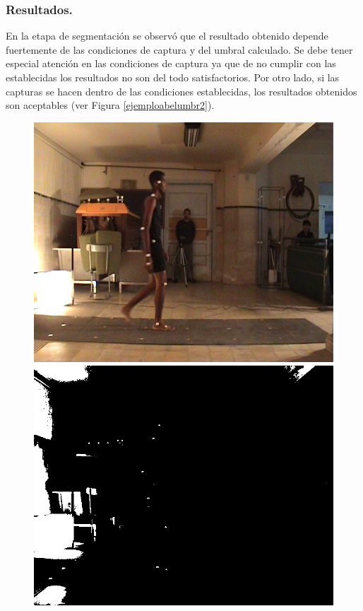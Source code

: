 \subsubsection{Resultados.}
En la etapa de segmentación se observó que el resultado obtenido depende fuertemente de las condiciones de captura y del umbral calculado. Se debe tener especial atención en las condiciones de captura ya que de no cumplir con las establecidas los resultados no son del todo satisfactorios. Por otro lado, si las capturas se hacen dentro de las condiciones establecidas, los resultados obtenidos son aceptables (ver Figura \ref{ejemploabelumbr2}).
\vspace{-0.5cm}
\begin{figure}[ht!]
      \centering
        {\includegraphics[scale=0.10]{imagenes/abel_original_video.png}\label{abelvideo}}\hspace{1 mm}
        {\includegraphics[scale=0.10]{imagenes/abel_original_filtro.png}\label{abelfiltro}}

\end{figure}

